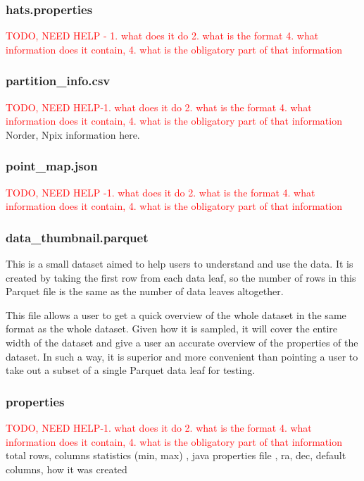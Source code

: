 \documentclass[11pt,a4paper]{ivoa}
\begin{document}
    \subsubsection{hats.properties} 
    \textcolor{red}{TODO, NEED HELP - 1. what does it do 2. what is the format 4. what information does it contain, 4. what is the obligatory part of that information} 
    
        \subsubsection{partition\_info.csv} 
   \textcolor{red}{TODO, NEED HELP-1. what does it do 2. what is the format 4. what information does it contain, 4. what is the obligatory part of that information}
	Norder, Npix  information here. 
    
        \subsubsection{point\_map.json} 
   \textcolor{red}{TODO, NEED HELP -1. what does it do 2. what is the format 4. what information does it contain, 4. what is the obligatory part of that information}
   
           \subsubsection{data\_thumbnail.parquet} 
  This is a small dataset aimed to help users to understand and use the data. It is created by taking the first row from each data leaf, so the number of rows in this Parquet file is the same as the number of data leaves altogether. \par
  This file allows a user to get a quick overview of the whole dataset in the same format as the whole dataset. Given how it is sampled, it will cover the entire width of the dataset and give a user an accurate overview of the properties of the dataset. In such a way, it is superior and more convenient than pointing a user to take out a subset of a single Parquet data leaf for testing. 
    
        \subsubsection{properties} 
   \textcolor{red}{TODO, NEED HELP-1. what does it do 2. what is the format 4. what information does it contain, 4. what is the obligatory part of that information}
     total rows, columns statistics (min, max) , java properties file , ra, dec, default columns, how it was created 
    
\end{document}
